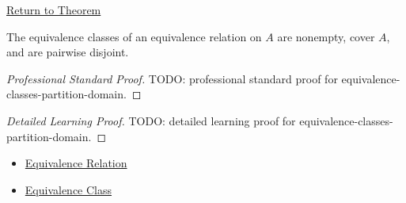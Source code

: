\newpage
{}
\label{prf:equivalence-classes-partition-domain}

\begin{remark*}[Return]
\hyperref[thm:equivalence-classes-partition-domain]{Return to Theorem}
\end{remark*}

\begin{theorem*}
The equivalence classes of an equivalence relation on $A$ are nonempty, cover
$A$, and are pairwise disjoint.
\end{theorem*}

\begin{proof}[Professional Standard Proof]
\LRAProofBodyStart
TODO: professional standard proof for equivalence-classes-partition-domain.
\end{proof}

\begin{proof}[Detailed Learning Proof]
\LRAProofBodyStart
TODO: detailed learning proof for equivalence-classes-partition-domain.
\end{proof}

\begin{remark*}
\end{remark*}

\begin{dependencies}
\begin{itemize}
  \item \hyperref[def:equivalence-relation]{Equivalence Relation}
  \item \hyperref[def:equivalence-class]{Equivalence Class}
\end{itemize}
\end{dependencies}

\clearpage
